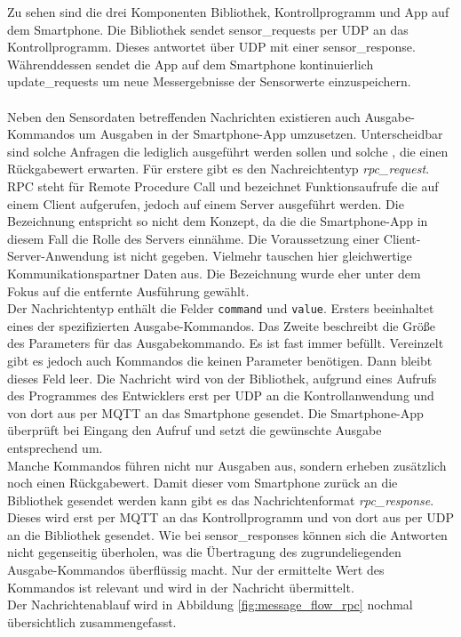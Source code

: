 \documentclass[11pt,a4paper]{report}
\begin{document}
Zu sehen sind die drei Komponenten Bibliothek, Kontrollprogramm und App auf dem Smartphone.
Die Bibliothek sendet sensor\_requests per UDP an das Kontrollprogramm.
Dieses antwortet über UDP mit einer sensor\_response.
Währenddessen sendet die App auf dem Smartphone kontinuierlich update\_requests um neue Messergebnisse der Sensorwerte einzuspeichern.
\\\\
Neben den Sensordaten betreffenden Nachrichten existieren auch Ausgabe-Kommandos um Ausgaben in der Smartphone-App umzusetzen.
Unterscheidbar sind solche Anfragen die lediglich ausgeführt werden sollen und solche , die einen Rückgabewert erwarten.
Für erstere gibt es den Nachreichtentyp \textit{rpc\_request}.
RPC steht für Remote Procedure Call und bezeichnet Funktionsaufrufe die auf einem Client aufgerufen, jedoch auf einem Server ausgeführt werden.
Die Bezeichnung entspricht so nicht dem Konzept, da die die Smartphone-App in diesem Fall die Rolle des Servers einnähme.
Die Voraussetzung einer Client-Server-Anwendung ist nicht gegeben.
Vielmehr tauschen hier gleichwertige Kommunikationspartner Daten aus.
Die Bezeichnung wurde eher unter dem Fokus auf die entfernte Ausführung gewählt.
\\
Der Nachrichtentyp enthält die Felder \texttt{command} und \texttt{value}.
Ersters beeinhaltet eines der spezifizierten Ausgabe-Kommandos.
Das Zweite beschreibt die Größe des Parameters für das Ausgabekommando.
Es ist fast immer befüllt.
Vereinzelt gibt es jedoch auch Kommandos die keinen Parameter benötigen.
Dann bleibt dieses Feld leer.
Die Nachricht wird von der Bibliothek, aufgrund eines Aufrufs des Programmes des Entwicklers erst per UDP an die Kontrollanwendung und von dort aus per MQTT an das Smartphone gesendet.
Die Smartphone-App überprüft bei Eingang den Aufruf und setzt die gewünschte Ausgabe entsprechend um.
\\
Manche Kommandos führen nicht nur Ausgaben aus, sondern erheben zusätzlich noch einen Rückgabewert.
Damit dieser vom Smartphone zurück an die Bibliothek gesendet werden kann gibt es das Nachrichtenformat \textit{rpc\_response}.
Dieses wird erst per MQTT an das Kontrollprogramm und von dort aus per UDP an die Bibliothek gesendet.
Wie bei sensor\_responses können sich die Antworten nicht gegenseitig überholen, was die Übertragung des zugrundeliegenden Ausgabe-Kommandos überflüssig macht.
Nur der ermittelte Wert des Kommandos ist relevant und wird in der Nachricht übermittelt.
\\
Der Nachrichtenablauf wird in Abbildung \ref{fig:message_flow_rpc} nochmal übersichtlich zusammengefasst.
\end{document}
